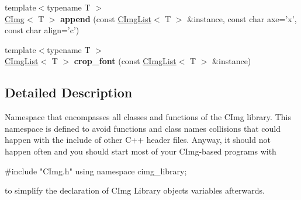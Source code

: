 \begin{DoxyCompactItemize}
\item 
\hypertarget{namespacecimg__library_acbcd3e0fdbd45689f04965f9698c8e3f}{{\footnotesize template$<$typename T $>$ }\\\hyperlink{structcimg__library_1_1_c_img}{C\-Img}$<$ T $>$ {\bfseries append} (const \hyperlink{structcimg__library_1_1_c_img_list}{C\-Img\-List}$<$ T $>$ \&instance, const char axe='x', const char align='c')}\label{namespacecimg__library_acbcd3e0fdbd45689f04965f9698c8e3f}

\item 
\hypertarget{namespacecimg__library_ab3f0d4a8d966090afad43ff2e41b39d1}{{\footnotesize template$<$typename T $>$ }\\\hyperlink{structcimg__library_1_1_c_img_list}{C\-Img\-List}$<$ T $>$ {\bfseries crop\-\_\-font} (const \hyperlink{structcimg__library_1_1_c_img_list}{C\-Img\-List}$<$ T $>$ \&instance)}\label{namespacecimg__library_ab3f0d4a8d966090afad43ff2e41b39d1}

\end{DoxyCompactItemize}


\subsection{Detailed Description}
Namespace that encompasses all classes and functions of the C\-Img library. This namespace is defined to avoid functions and class names collisions that could happen with the include of other C++ header files. Anyway, it should not happen often and you should start most of your C\-Img-\/based programs with 
\begin{DoxyCode}
\textcolor{preprocessor}{#include "CImg.h"}
\textcolor{keyword}{using namespace }cimg\_library;
\end{DoxyCode}
 to simplify the declaration of C\-Img Library objects variables afterwards. 
